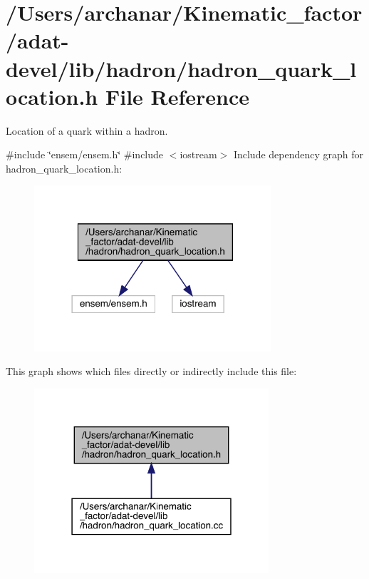 \hypertarget{adat-devel_2lib_2hadron_2hadron__quark__location_8h}{}\section{/\+Users/archanar/\+Kinematic\+\_\+factor/adat-\/devel/lib/hadron/hadron\+\_\+quark\+\_\+location.h File Reference}
\label{adat-devel_2lib_2hadron_2hadron__quark__location_8h}


Location of a quark within a hadron.  


{\ttfamily \#include \char`\"{}ensem/ensem.\+h\char`\"{}}\newline
{\ttfamily \#include $<$iostream$>$}\newline
Include dependency graph for hadron\+\_\+quark\+\_\+location.\+h\+:
\nopagebreak
\begin{figure}[H]
\begin{center}
\leavevmode
\includegraphics[width=249pt]{dc/ddc/adat-devel_2lib_2hadron_2hadron__quark__location_8h__incl}
\end{center}
\end{figure}
This graph shows which files directly or indirectly include this file\+:
\nopagebreak
\begin{figure}[H]
\begin{center}
\leavevmode
\includegraphics[width=247pt]{d8/d99/adat-devel_2lib_2hadron_2hadron__quark__location_8h__dep__incl}
\end{center}
\end{figure}

